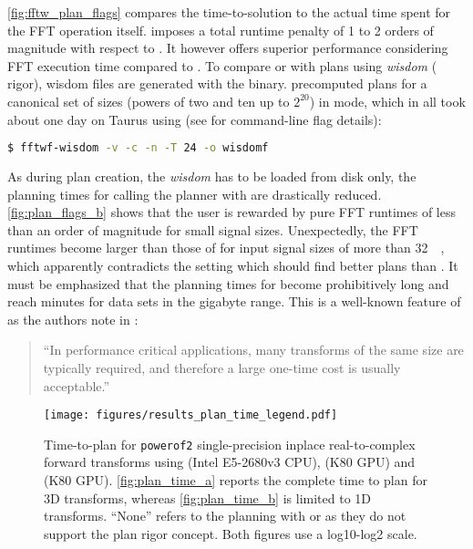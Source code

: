\cref{fig:fftw_plan_flags} compares the time-to-solution to the actual time spent for the FFT operation itself.  imposes a total runtime penalty of 1 to 2 orders of magnitude with respect to . It however offers superior performance considering FFT execution time compared to . To compare  or  with plans using \emph{wisdom} ( rigor), wisdom files are generated with the  binary.  precomputed plans for a canonical set of sizes (powers of two and ten up to $2^{20}$) in  mode, which in all took about one day on Taurus \cite{taurus} using (see \cite{fftw_manual} for command-line flag details):
\begin{lstlisting}[language=bash]
 $ fftwf-wisdom -v -c -n -T 24 -o wisdomf
\end{lstlisting}

As during plan creation, the \emph{wisdom} has to be loaded from disk only, the planning times for calling the planner with  are drastically reduced. \cref{fig:plan_flags_b} shows that the user is rewarded by pure FFT runtimes of less than an order of magnitude for small signal sizes. Unexpectedly, the FFT runtimes become larger than those of  for input signal sizes of more than \SI{32}{\kibi\byte}, which apparently contradicts the  setting which should find better plans than .
%
It must be emphasized that the planning times for  become prohibitively long and reach minutes for data sets in the gigabyte range. This is a well-known feature of \fftw{} as the authors note in \cite{FFTW05}:
%
\begin{quote}
  ``In performance critical applications, many transforms of the same
  size are typically required, and therefore a large one-time cost is
  usually acceptable.''
\end{quote}

\begin{figure}[!tbp]
  \centering
  \texttt{[image: figures/results\_plan\_time\_legend.pdf]}\vspace{-1em}
  \hfill
  \caption{Time-to-plan for \texttt{powerof2} single-precision inplace real-to-complex forward transforms using \fftw{} (Intel E5-2680v3 CPU), \cufft{} (K80 GPU) and \clfft{} (K80 GPU). \cref{fig:plan_time_a} reports the complete time to plan for 3D transforms, whereas \cref{fig:plan_time_b} is limited to 1D transforms. ``None'' refers to the planning with \cufft{} or \clfft{} as they do not support the plan rigor concept. Both figures use a log10-log2 scale.}
  \label{fig:plan_time}
\end{figure}

